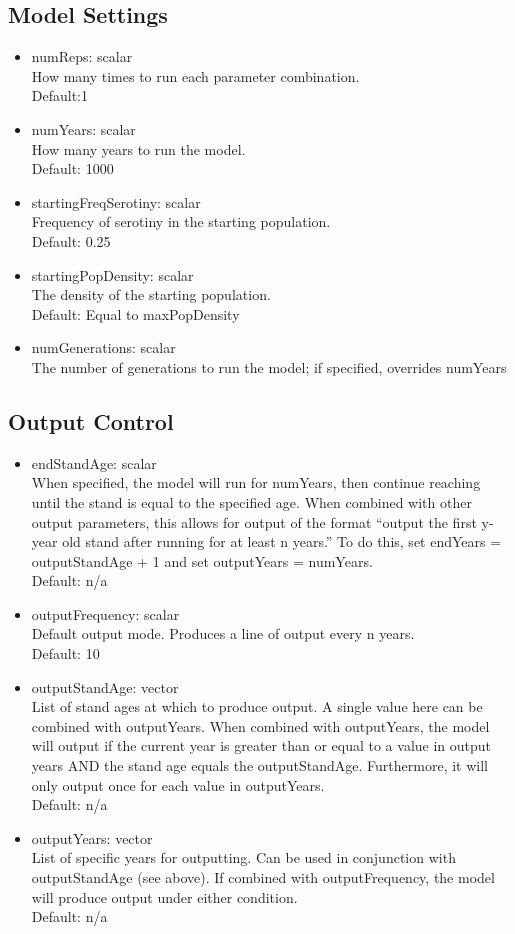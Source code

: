 \documentclass[12pt, english]{article}
\begin{document}
\subsection{Model Settings}
\begin{itemize}
	\item{numReps: scalar\\How many times to run each parameter combination.\\Default:1}
	\item{numYears: scalar\\How many years to run the model.\\Default: 1000}
	\item{startingFreqSerotiny: scalar\\Frequency of serotiny in the starting population.\\Default: 0.25}
	\item{startingPopDensity: scalar\\The density of the starting population.\\Default: Equal to maxPopDensity}
	\item{numGenerations: scalar\\ The number of generations to run the model; if specified, overrides numYears}
\end{itemize}

\subsection{Output Control}
\label{subsec:output}
\begin{itemize}
	\item{endStandAge: scalar\\When specified, the model will run for numYears, then continue reaching until the stand is equal to the specified age. When combined with other output parameters, this allows for output of the format ``output the first y-year old stand after running for at least n years.'' To do this, set endYears = outputStandAge + 1 and set outputYears = numYears.\\Default: n/a	}
	\item{outputFrequency: scalar\\Default output mode. Produces a line of output every n years.\\Default: 10}
	\item{outputStandAge: vector\\List of stand ages at which to produce output. A single value here can be combined with outputYears. When combined with outputYears, the model will output if the current year is greater than or equal to a value in output years AND the stand age equals the outputStandAge. Furthermore, it will only output once for each value in outputYears.\\Default: n/a}
	\item{outputYears: vector\\List of specific years for outputting. Can be used in conjunction with outputStandAge (see above). If combined with outputFrequency, the model will produce output under either condition.\\Default: n/a}

\end{itemize}


\renewcommand\refname{Literature Cited}
{}
\end{document}
